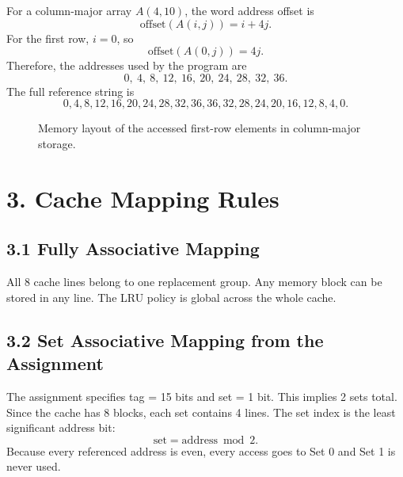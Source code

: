 \documentclass{article}
\begin{document}
For a column-major array $A(4,10)$, the word address offset is
\[
\text{offset}(A(i,j)) = i + 4j.
\]
For the first row, $i=0$, so
\[
\text{offset}(A(0,j)) = 4j.
\]
Therefore, the addresses used by the program are
\[
0,\ 4,\ 8,\ 12,\ 16,\ 20,\ 24,\ 28,\ 32,\ 36.
\]
The full reference string is
\[
0,4,8,12,16,20,24,28,32,36,36,32,28,24,20,16,12,8,4,0.
\]

\begin{figure}[H]
\centering
{}
\caption{Memory layout of the accessed first-row elements in column-major storage.}
\end{figure}

\section*{3. Cache Mapping Rules}

\subsection*{3.1 Fully Associative Mapping}
All 8 cache lines belong to one replacement group. Any memory block can be stored in any line. The LRU policy is global across the whole cache.

\subsection*{3.2 Set Associative Mapping from the Assignment}
The assignment specifies tag = 15 bits and set = 1 bit. This implies 2 sets total. Since the cache has 8 blocks, each set contains 4 lines. The set index is the least significant address bit:
\[
\text{set} = \text{address} \bmod 2.
\]
Because every referenced address is even, every access goes to Set 0 and Set 1 is never used.
\end{document}
